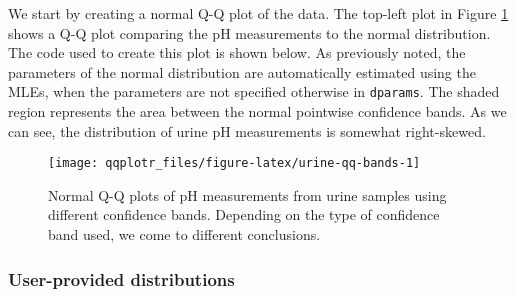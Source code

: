 We start by creating a normal Q-Q plot of the data. The top-left plot in
Figure \ref{fig:urine-qq-bands} shows a Q-Q plot comparing the pH
measurements to the normal distribution. The code used to create this
plot is shown below. As previously noted, the parameters of the normal
distribution are automatically estimated using the MLEs, when the
parameters are not specified otherwise in \texttt{dparams}. The shaded
region represents the area between the normal pointwise confidence
bands. As we can see, the distribution of urine pH measurements is
somewhat right-skewed.

\begin{Schunk}
\end{Schunk}

\begin{Schunk}
\begin{figure}

{\centering \texttt{[image: qqplotr\_files/figure-latex/urine-qq-bands-1]} 

}

\caption[Normal Q-Q plots of pH measurements from urine samples using different confidence bands]{Normal Q-Q plots of pH measurements from urine samples using different confidence bands. Depending on the type of confidence band used, we come to different conclusions.}\label{fig:urine-qq-bands}
\end{figure}
\end{Schunk}

\FloatBarrier

\subsubsection{User-provided
distributions}\label{user-provided-distributions}

\label{sec:user-dists}

